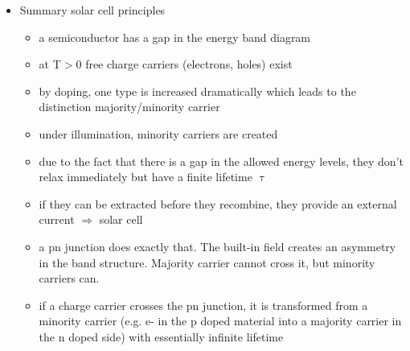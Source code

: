 \begin{itemize}
 \item Summary solar cell principles
 \begin{itemize}
  \item a semiconductor has a gap in the energy band diagram
  \item at T$>$0 free charge carriers (electrons, holes) exist
  \item by doping, one type is increased dramatically which leads to the distinction majority/minority carrier
  \item under illumination, minority carriers are created
  \item due to the fact that there is a gap in the allowed energy levels, they don’t relax immediately but have a finite lifetime $\uptau$
  \item if they can be extracted before they recombine, they provide an external current $\Rightarrow$ solar cell
  \item a pn junction does exactly that. The built-in field creates an asymmetry in the band structure. Majority carrier cannot cross it, but minority carriers can.
  \item if a charge carrier crosses the pn junction, it is transformed from a minority carrier (e.g. e- in the p doped material into a majority carrier in the n doped side) with 
  essentially infinite lifetime
 \end{itemize}
\end{itemize}

